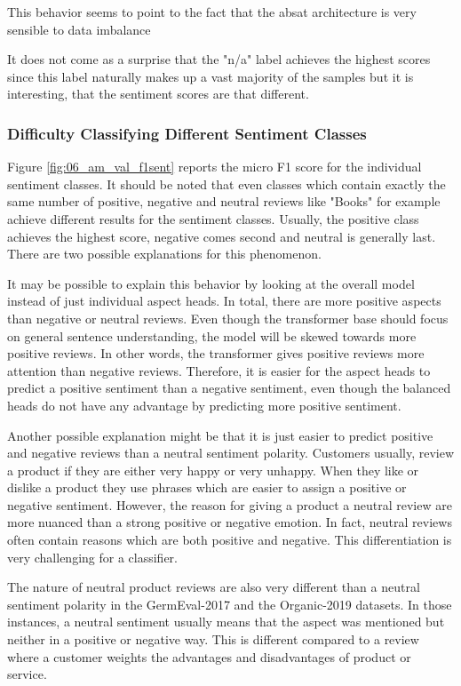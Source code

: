This behavior seems to point to the fact that the \gls{absat} architecture is very sensible to data imbalance


It does not come as a surprise that the "n/a" label achieves the highest scores since this label naturally makes up a vast majority of the samples but it is interesting, that the sentiment scores are that different.

\subsubsection*{Difficulty Classifying Different Sentiment Classes}

Figure \ref{fig:06_am_val_f1sent} reports the micro F1 score for the individual sentiment classes. It should be noted that even classes which contain exactly the same number of positive, negative and neutral reviews like "Books" for example achieve different results for the sentiment classes. Usually, the positive class achieves the highest score, negative comes second and neutral is generally last. There are two possible explanations for this phenomenon.
\smallskip

It may be possible to explain this behavior by looking at the overall model instead of just individual aspect heads. In total, there are more positive aspects than negative or neutral reviews. Even though the transformer base should focus on general sentence understanding, the model will be skewed towards more positive reviews. In other words, the transformer gives positive reviews more attention than negative reviews. Therefore, it is easier for the aspect heads to predict a positive sentiment than a negative sentiment, even though the balanced heads do not have any advantage by predicting more positive sentiment.
\bigskip

Another possible explanation might be that it is just easier to predict positive and negative reviews than a neutral sentiment polarity. Customers usually, review a product if they are either very happy or very unhappy. When they like or dislike a product they use phrases which are easier to assign a positive or negative sentiment. However, the reason for giving a product a neutral review are more nuanced than a strong positive or negative emotion. In fact, neutral reviews often contain reasons which are both positive and negative. This differentiation is very challenging for a classifier. 
\smallskip

The nature of neutral product reviews are also very different than a neutral sentiment polarity in the GermEval-2017 and the Organic-2019 datasets. In those instances, a neutral sentiment usually means that the aspect was mentioned but neither in a positive or negative way. This is different compared to a review where a customer weights the advantages and disadvantages of product or service.

